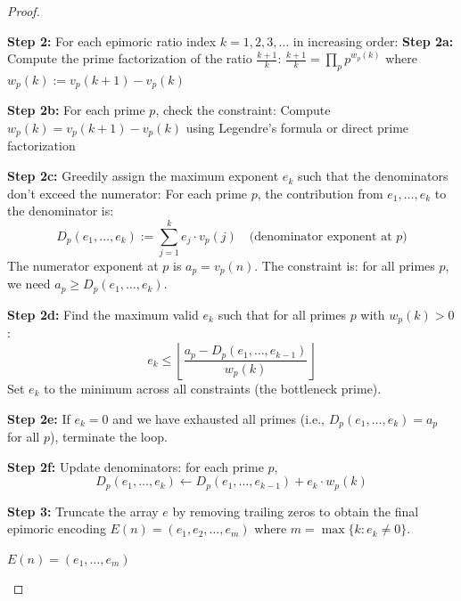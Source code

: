 \begin{proof}
\begin{algorithm}
\begin{algorithmic}
\STATE \textbf{Step 2:} For each epimoric ratio index $k = 1, 2, 3, \ldots$ in increasing order:
  \STATE \textbf{Step 2a:} Compute the prime factorization of the ratio $\frac{k+1}{k}$:
  \STATE \quad $\frac{k+1}{k} = \prod_p p^{w_p(k)}$ where $w_p(k) := v_p(k+1) - v_p(k)$

  \STATE \textbf{Step 2b:} For each prime $p$, check the constraint:
    \STATE Compute $w_p(k) = v_p(k+1) - v_p(k)$ using Legendre's formula or direct prime factorization
  \ENDFOR

  \STATE \textbf{Step 2c:} Greedily assign the maximum exponent $e_k$ such that the denominators don't exceed the numerator:
  \STATE For each prime $p$, the contribution from $e_1, \ldots, e_k$ to the denominator is:
  \begin{equation}
  D_p(e_1, \ldots, e_k) := \sum_{j=1}^k e_j \cdot v_p(j) \quad \text{(denominator exponent at } p \text{)}
  \end{equation}
  \STATE The numerator exponent at $p$ is $a_p = v_p(n)$.
  \STATE The constraint is: for all primes $p$, we need $a_p \geq D_p(e_1, \ldots, e_k)$.

  \STATE \textbf{Step 2d:} Find the maximum valid $e_k$ such that for all primes $p$ with $w_p(k) > 0$:
  \begin{equation}
  e_k \leq \left\lfloor \frac{a_p - D_p(e_1, \ldots, e_{k-1})}{w_p(k)} \right\rfloor
  \end{equation}
  \STATE Set $e_k$ to the minimum across all constraints (the bottleneck prime).

  \STATE \textbf{Step 2e:} If $e_k = 0$ and we have exhausted all primes (i.e., $D_p(e_1, \ldots, e_k) = a_p$ for all $p$), terminate the loop.

  \STATE \textbf{Step 2f:} Update denominators: for each prime $p$,
  \begin{equation}
  D_p(e_1, \ldots, e_k) \gets D_p(e_1, \ldots, e_{k-1}) + e_k \cdot w_p(k)
  \end{equation}
\ENDFOR

\STATE \textbf{Step 3:} Truncate the array $e$ by removing trailing zeros to obtain the final epimoric encoding $E(n) = (e_1, e_2, \ldots, e_{m})$ where $m = \max\{k : e_k \neq 0\}$.

\RETURN $E(n) = (e_1, \ldots, e_m)$
\end{algorithmic}
\end{algorithm}

\begin{remark}


\end{remark}
\end{proof}
